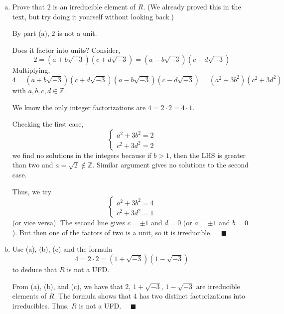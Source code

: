 \documentclass[12pt]{article}
\newcommand{\Z}{\mathbb{Z}}
\newcommand{\qed}{\quad \blacksquare}
\begin{document}
\begin{enumerate}[(a)]
        \color{black}
    
    \item Prove that $2$ is an irreducible element of $R$. (We already proved this in the text, but try doing it yourself without looking back.)
    
        \color{blue}
            By part (a), $2$ is not a unit.

            Does it factor into units? Consider, 
            \[2 = (a + b\sqrt{-3})(c + d\sqrt{-3}) = (a - b\sqrt{-3})(c - d\sqrt{-3})\]
            Multiplying, 
            \[4 =  (a + b\sqrt{-3})(c + d\sqrt{-3})(a - b\sqrt{-3})(c - d\sqrt{-3}) = (a^2 + 3b^2)(c^2  + 3d^2)\]
            with $a, b, c, d \in \Z$. 

            We know the only integer factorizations are $4 = 2 \cdot 2 = 4 \cdot 1$. 

            Checking the first case,
            \[\begin{cases}
                a^2 + 3b^2 = 2\\
                c^2 + 3d^2 = 2
            \end{cases}\]
            we find no solutions in the integers because if $b > 1$, then the LHS is greater than two and $a = \sqrt{2} \not \in \Z$. Similar argument gives no solutions to the second case.

            Thus, we try 
            \[\begin{cases}
                a^2 + 3b^2 = 4\\
                c^2 + 3d^2 = 1
            \end{cases}\]
            (or vice versa). The second line gives $c = \pm 1$ and $d = 0$ (or $a = \pm 1$ and $b = 0$). But then one of the factors of two is a unit, so it is irreducible. $\qed$

        \color{black}

    \item Use (a), (b), (c) and the formula 
    \[4 = 2 \cdot 2 = (1 + \sqrt{-3})(1 - \sqrt{-3})\]
    to deduce that $R$ is not a UFD.

        \color{blue}
            From (a), (b), and (c), we have that $2$, $1 + \sqrt{-3}$, $1 - \sqrt{-3}$ are irreducible elements of $R$. The formula shows that $4$ has two distinct factorizations into irreducibles. Thus, $R$ is not a UFD. $\qed$

        \color{black}
\end{enumerate}
\end{document}
